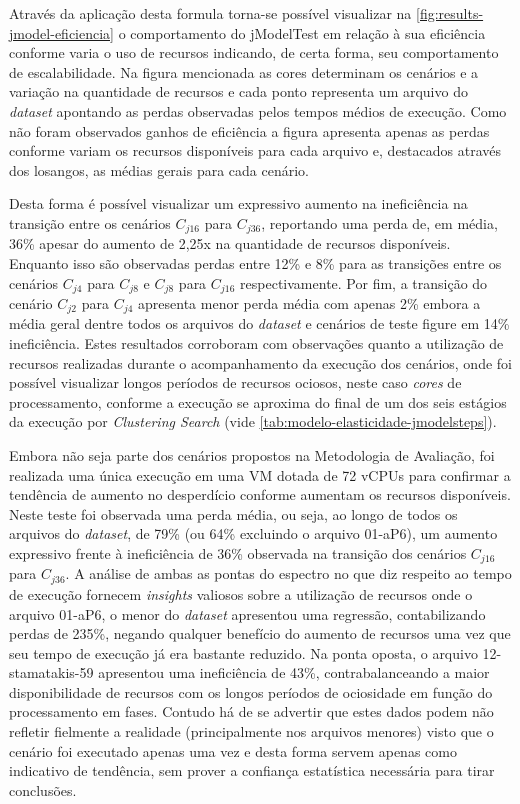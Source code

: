 \documentclass[english,brazilian]{UNISINOSmonografia} %
\begin{document}
Através da aplicação desta formula torna-se possível visualizar na \autoref{fig:results-jmodel-eficiencia} o comportamento do jModelTest em relação à sua eficiência conforme varia o uso de recursos indicando, de certa forma, seu comportamento de escalabilidade.
%
Na figura mencionada as cores determinam os cenários e a variação na quantidade de recursos e cada ponto representa um arquivo do \textit{dataset} apontando as perdas observadas pelos tempos médios de execução.
%
Como não foram observados ganhos de eficiência a figura apresenta apenas as perdas conforme variam os recursos disponíveis para cada arquivo e, destacados através dos losangos, as médias gerais para cada cenário.



Desta forma é possível visualizar um expressivo aumento na ineficiência na transição entre os cenários $C_{j16}$ para $C_{j36}$, reportando uma perda de, em média, 36\% apesar do aumento de 2,25x na quantidade de recursos disponíveis.
%
Enquanto isso são observadas perdas entre 12\% e 8\% para as transições entre os cenários $C_{j4}$ para $C_{j8}$ e $C_{j8}$ para $C_{j16}$ respectivamente.
%
Por fim, a transição do cenário $C_{j2}$ para $C_{j4}$ apresenta menor perda média com apenas 2\% embora a média geral dentre todos os arquivos do \textit{dataset} e cenários de teste figure em 14\% ineficiência.
%
Estes resultados corroboram com observações quanto a utilização de recursos realizadas durante o acompanhamento da execução dos cenários, onde foi possível visualizar longos períodos de recursos ociosos, neste caso \textit{cores} de processamento, conforme a execução se aproxima do final de um dos seis estágios da execução por \textit{Clustering Search} (vide \autoref{tab:modelo-elasticidade-jmodelsteps}).



Embora não seja parte dos cenários propostos na Metodologia de Avaliação, foi realizada uma única execução em uma VM dotada de 72 vCPUs para confirmar a tendência de aumento no desperdício conforme aumentam os recursos disponíveis.
%
Neste teste foi observada uma perda média, ou seja, ao longo de todos os arquivos do \textit{dataset}, de 79\% (ou 64\% excluindo o arquivo 01-aP6), um aumento expressivo frente à ineficiência de 36\% observada na transição dos cenários $C_{j16}$ para $C_{j36}$.
%
A análise de ambas as pontas do espectro no que diz respeito ao tempo de execução fornecem \textit{insights} valiosos sobre a utilização de recursos onde o arquivo 01-aP6, o menor do \textit{dataset} apresentou uma regressão, contabilizando perdas de 235\%, negando qualquer benefício do aumento de recursos uma vez que seu tempo de execução já era bastante reduzido.
%
Na ponta oposta, o arquivo 12-stamatakis-59 apresentou uma ineficiência de 43\%, contrabalanceando a maior disponibilidade de recursos com os longos períodos de ociosidade em função do processamento em fases.
%
Contudo há de se advertir que estes dados podem não refletir fielmente a realidade (principalmente nos arquivos menores) visto que o cenário foi executado apenas uma vez e desta forma servem apenas como indicativo de tendência, sem prover a confiança estatística necessária para tirar conclusões.
\end{document}
